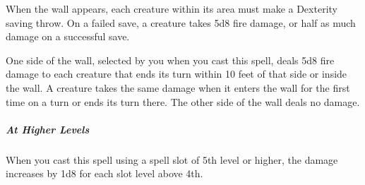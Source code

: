 {When the wall appears, each creature within its area must make a Dexterity saving throw. On a failed save, a creature takes 5d8 fire damage, or half as much damage on a successful save.

One side of the wall, selected by you when you cast this spell, deals 5d8 fire damage to each creature that ends its turn within 10 feet of that side or inside the wall. A creature takes the same damage when it enters the wall for the first time on a turn or ends its turn there. The other side of the wall deals no damage.

\subparagraph*{At Higher Levels} When you cast this spell using a spell slot of 5th level or higher, the damage increases by 1d8 for each slot level above 4th.
}